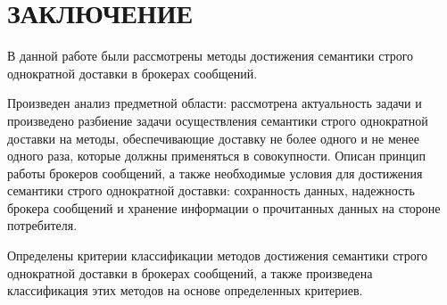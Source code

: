 \chapter*{ЗАКЛЮЧЕНИЕ}

В данной работе были рассмотрены методы достижения семантики строго однократной доставки в брокерах сообщений.

Произведен анализ предметной области: рассмотрена актуальность задачи и произведено разбиение задачи осуществления семантики строго однократной доставки на методы, обеспечивающие доставку не более одного и не менее одного раза, которые должны применяться в совокупности. Описан принцип работы брокеров сообщений, а также необходимые условия для достижения семантики строго однократной доставки: сохранность данных, надежность брокера сообщений и хранение информации о прочитанных данных на стороне потребителя.

Определены критерии классификации методов достижения семантики строго однократной доставки в брокерах сообщений, а также произведена классификация этих методов на основе определенных критериев.